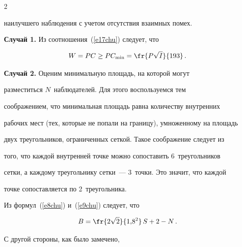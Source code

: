\begin{multicols}{2}
\begin{enumerate}[1.]
наилучшего наблюдения с учетом отсутствия взаимных помех.


\end{enumerate}





\smallskip





\noindent


\textbf{Случай 1.} Из соотношения~(\ref{e17chu}) следует, что


\begin{equation*}


W= PC\geq PC_{\min}=\fr{P\sqrt{I}}{193}\,.




\end{equation*}





\smallskip





\noindent


\textbf{Случай 2.} Оценим минимальную площадь, на которой могут 


разместиться $N$~наблюдателей. Для этого воспользуемся тем 


соображением, что минимальная площадь равна количеству внутренних 


рабочих мест (тех, которые не попали на границу), умноженному на площадь 


двух треугольников, ограниченных сеткой. Такое соображение следует из 


того, что каждой внутренней точке можно сопоставить 6~треугольников 


сетки, а каждому треугольнику сетки~--- 3~точки. Это значит, что каждой 


точке сопоставляется по 2~треугольника.





Из формул~(\ref{e8chu}) и~(\ref{e9chu}) следует, что


\begin{equation*}


B=\fr{2\sqrt{2}}{1{,}8^2}\,S+2-N\,.




\end{equation*}


С другой стороны, как было замечено,



\end{multicols}
